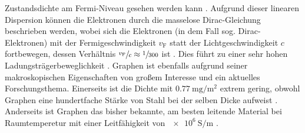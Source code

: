 Zustandsdichte am Fermi-Niveau gesehen werden kann \cite{10.1093/nsr/nwu080}. 
Aufgrund dieser linearen Dispersion können die Elektronen durch die masselose Dirac-Gleichung beschrieben werden, wobei sich 
die Elektronen (in dem Fall sog. Dirac-Elektronen) mit der Fermigeschwindigkeit $v_\text{F}$ statt der Lichtgeschwindigkeit $c$ fortbewegen,
dessen Verhältnis $\sfrac{v_\text{F}}{c} \approx \sfrac{1}{300}$ ist \cite{Avouris2007}.
Dies führt zu einer sehr hohen Ladungsträgerbeweglichkeit \cite{https://doi.org/10.1002/adma.201201482}.
Graphen ist ebenfalls aufgrund seiner makroskopischen Eigenschaften von großem Interesse und ein aktuelles Forschungsthema.
Einerseits ist die  Dichte mit $\qty{0.77}{\milli\gram\per\metre\squared}$ extrem gering, obwohl 
Graphen eine hundertfache Stärke von Stahl bei der selben Dicke aufweist \cite{graphene_properties}. 
Anderseits ist Graphen das bisher bekannte, am besten leitende Material bei Raumtemperetur mit einer Leitfähigkeit von 
$\qty{e6}{\siemens\per\metre}$ \cite{graphene_properties}.